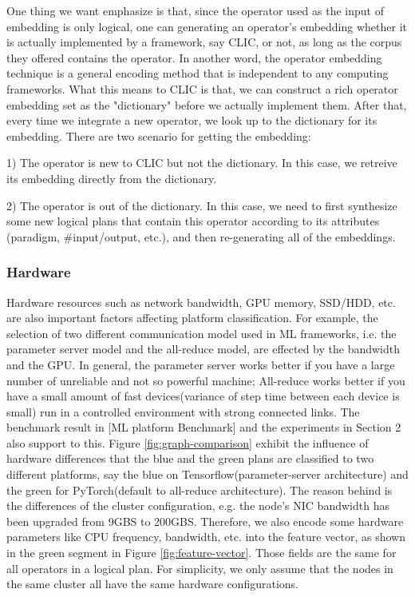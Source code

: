 One thing we want emphasize is that,  
since the operator used as the input of embedding is only logical,
one can generating an operator's embedding whether it is actually implemented by a framework, say CLIC, or not, 
as long as the corpus they offered contains the operator.
In another word, the operator embedding technique is a general encoding method that is independent to any computing frameworks.
What this means to CLIC is that, we can construct a rich operator embedding set as the "dictionary" before we actually implement them.
After that, every time we integrate a new operator, we look up to the dictionary for its embedding. There are two scenario for getting the embedding:

1) The operator is new to CLIC but not the dictionary. In this case, we retreive its embedding directly from the dictionary.

2) The operator is out of the dictionary. In this case, we need to first synthesize some new logical plans that contain this operator according to its attributes (paradigm, \#input/output, etc.), and then re-generating all of the embeddings.


\subsubsection{Hardware}
Hardware resources such as network bandwidth, GPU memory, SSD/HDD, etc. are also important factors affecting platform classification. 
For example, the selection of two different communication model used in ML frameworks, i.e. the parameter server model and the all-reduce model, are effected by the bandwidth and the GPU. 
In general, the parameter server works better if you have a large number of unreliable and not so powerful machine;
All-reduce works better if you have a small amount of fast devices(variance of step time between each device is small) run in a controlled environment with strong connected links. 
The benchmark result in [ML platform Benchmark] and the experiments in Section 2 also support to this. 
Figure \ref{fig:graph-comparison} exhibit the influence of hardware differences that the blue and the green plans are classified to two different platforms, 
say the blue on Tensorflow(parameter-server architecture) and the green for PyTorch(default to all-reduce architecture).
The reason behind is the differences of the cluster configuration, e.g. the node's NIC bandwidth has been upgraded from 9GBS to 200GBS.
Therefore, we also encode some hardware parameters like CPU frequency, bandwidth, etc. into the feature vector, 
as shown in the green segment in Figure \ref{fig:feature-vector}. 
Those fields are the same for all operators in a logical plan. 
For simplicity, we only assume that the nodes in the same cluster all have the same hardware configurations.

